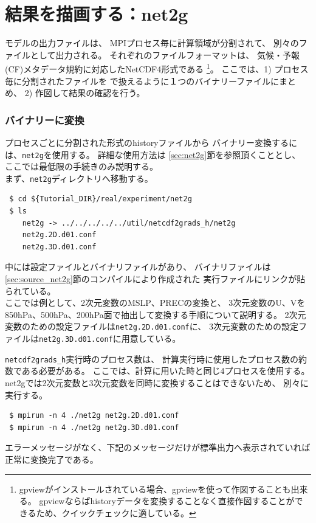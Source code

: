 \section{結果を描画する：net2g} \label{sec:quicklook}

\scalerm モデルの出力ファイルは、
MPIプロセス毎に計算領域が分割されて、
別々のファイルとして出力される。
それぞれのファイルフォーマットは、
気候・予報(CF)メタデータ規約に対応したNetCDF4形式である
\footnote{gpviewがインストールされている場合、gpviewを使って作図することも出来る。
gpviewならばhistoryデータを変換することなく直接作図することができるため、クイックチェックに適している。}。
ここでは、1) プロセス毎に分割された{\netcdf}ファイルを
{\grads}で扱えるように１つのバイナリーファイルにまとめ、
2) 作図して結果の確認を行う。

\subsubsection{{\grads}バイナリーに変換}
プロセスごとに分割された{\netcdf}形式のhistoryファイルから
{\grads}バイナリー変換するには、\verb|net2g|を使用する。
詳細な使用方法は \ref{sec:net2g}節を参照頂くこととし、
ここでは最低限の手続きのみ説明する。\\

まず、\verb|net2g|ディレクトリへ移動する。
\begin{verbatim}
 $ cd ${Tutorial_DIR}/real/experiment/net2g
 $ ls
    net2g -> ../../../../../util/netcdf2grads_h/net2g
    net2g.2D.d01.conf
    net2g.3D.d01.conf
\end{verbatim}
中には設定ファイルとバイナリファイルがあり、
バイナリファイルは\ref{sec:source_net2g}節のコンパイルにより作成された
実行ファイルにリンクが貼られている。\\

ここでは例として、2次元変数のMSLP、PRECの変換と、
3次元変数のU、Vを850hPa、500hPa、200hPa面で抽出して変換する手順について説明する。
2次元変数のための設定ファイルは\verb|net2g.2D.d01.conf|に、
3次元変数のための設定ファイルは\verb|net2g.3D.d01.conf|に用意している。

\verb|netcdf2grads_h|実行時のプロセス数は、
計算実行時に使用したプロセス数の約数である必要がある。
ここでは、計算に用いた時と同じ4プロセスを使用する。
net2gでは2次元変数と3次元変数を同時に変換することはできないため、
別々に実行する。
\begin{verbatim}
 $ mpirun -n 4 ./net2g net2g.2D.d01.conf
 $ mpirun -n 4 ./net2g net2g.3D.d01.conf
\end{verbatim}
エラーメッセージがなく、下記のメッセージだけが標準出力へ表示されていれば正常に変換完了である。\\


